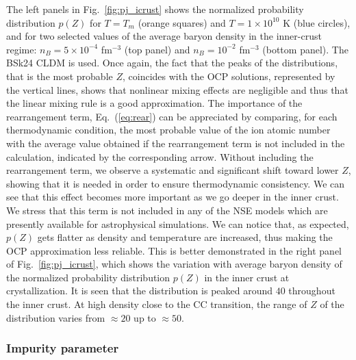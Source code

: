%
The left panels in Fig.~\ref{fig:pj_icrust} shows the normalized
probability distribution $p(Z)$ for $T=T_m$ (orange squares) and 
$T=1\times 10^{10}$ K (blue circles), and for
two selected values of the average baryon density in the inner-crust regime:
$n_B = 5\times 10^{-4}$ fm$^{-3}$ (top panel) and $n_B = 10^{-2}$ fm$^{-3}$
(bottom panel). The BSk24 CLDM is used.
%
Once again, the fact that the peaks of the distributions, that is the most
probable $Z$, coincides with the OCP solutions, represented by the vertical 
lines, shows that nonlinear mixing effects are negligible and thus 
that the linear mixing rule is a good approximation.
%
The importance of the rearrangement term, Eq.~(\ref{eq:rear}) can be 
appreciated by comparing, for each thermodynamic condition, the most probable
value of the ion atomic number with the average value obtained if the 
rearrangement term is not included in the calculation, indicated by the
corresponding arrow. Without including the rearrangement term, we observe a 
systematic and significant shift toward lower $Z$, showing that it is needed 
in order to ensure thermodynamic consistency. We can see that this effect
becomes more important as we go deeper in the inner crust. We stress that this 
term is not included in any of the NSE models which are presently available for 
astrophysical simulations. 
We can notice that, as expected, $p(Z)$ gets flatter as
density and temperature are increased, thus making the OCP approximation less
reliable. This is better demonstrated in the right panel of
Fig.~\ref{fig:pj_icrust}, which shows the variation with average baryon density 
of the normalized probability distribution $p(Z)$ in the inner crust at
crystallization.
It is seen that the distribution is peaked around $40$ throughout the inner
crust. At high density close to the CC transition, the range of $Z$ of the
distribution varies from $\approx 20$ up to $\approx 50$.

\subsubsection{Impurity parameter}\label{subsubsec:eos_qimp}

